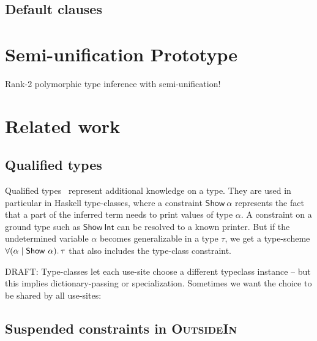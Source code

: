\documentclass[acmsmall,screen,nonacm]{acmart}
\begin{document}



\subsection{Default clauses}

\section{Semi-unification Prototype}

Rank-2 polymorphic type inference with semi-unification!


\section{Related work}
\label{sec:related-work}

\subsection{Qualified types}


Qualified types~\citep*{TODO} represent additional knowledge on a type. They
are used in particular in Haskell type-classes, where a constraint
$\mathsf{Show}~\alpha$ represents the fact that a part of the inferred term
needs to print values of type $\alpha$. A constraint on a ground type such
as $\mathsf{Show}~\mathsf{Int}$ can be resolved to a known printer. But if
the undetermined variable $\alpha$ becomes generalizable in a type $\tau$,
we get a type-scheme $\forall {(\alpha \mid \mathsf{Show}~\alpha)}.\,{\tau}$ that
also includes the type-class constraint.

DRAFT: Type-classes let each use-site choose a different typeclass instance
-- but this implies dictionary-passing or specialization. Sometimes we want
the choice to be shared by all use-sites:


\subsection{Suspended constraints in \textsc{OutsideIn}}
\end{document}
